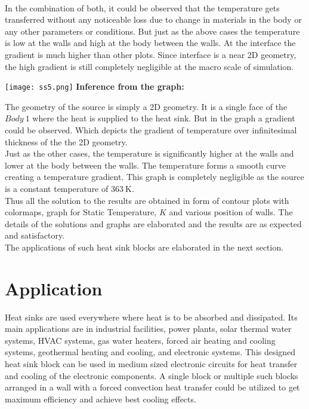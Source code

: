 \documentclass{article}
\begin{document}
\vspace{1cm}\\
In the combination of both, it could be observed that the temperature gets transferred without any noticeable loss due to change in materials in the body or any other parameters or conditions. But just as the above cases the temperature is low at the walls and high at the body between the walls. At the interface the gradient is much higher than other plots. Since interface is a near 2D geometry, the high gradient is still completely negligible at the macro scale of simulation. 
\begin{center}
    \texttt{[image: ss5.png]}
    \vspace{2cm}
    \textbf{Inference from the graph: }
    \vspace{1cm}
\end{center} 
The geometry of the source is simply a 2D geometry. It is a single face of the $Body\ 1$ where the heat is supplied to the heat sink. But in the graph a gradient could be observed. Which depicts the gradient of temperature over infinitesimal thickness of the the 2D geometry. 
\vspace{1cm}\\
Just as the other cases, the temperature is significantly higher at the walls and lower at the body between the walls. The temperature forms a smooth curve creating a temperature gradient. This graph is completely negligible as the source is a constant temperature of $\SI{363}{\kelvin}$. 
\vspace{2cm}\\

Thus all the solution to the results are obtained in form of contour plots with colormaps, graph for Static Temperature, $K$ and various position of walls. The details of the solutions and graphs are elaborated and the results are as expected and satisfactory.
\vspace{1cm}\\
The applications of such heat sink blocks are elaborated in the next section. 

\newpage
\section{Application}

Heat sinks are used everywhere where heat is to be absorbed and dissipated. Its main applications are in industrial facilities, power plants, solar thermal water systems, HVAC systems, gas water heaters, forced air heating and cooling systems, geothermal heating and cooling, and electronic systems. This designed heat sink block can be used in medium sized electronic circuits for heat transfer and cooling of the electronic components. A single block or multiple such blocks arranged in a wall with a forced convection heat transfer could be utilized to get maximum efficiency and achieve best cooling effects.
\end{document}
